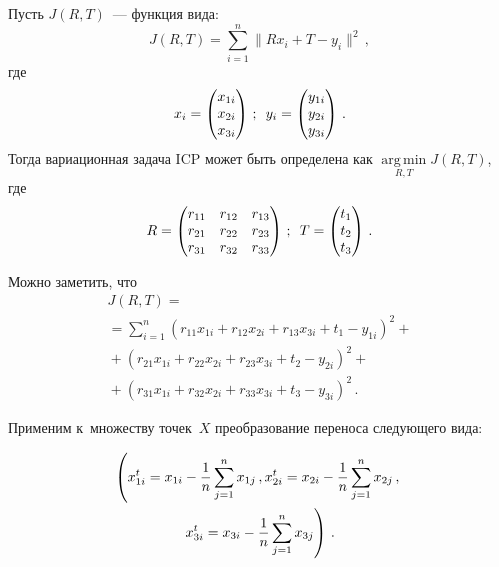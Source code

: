 \begin{multicols}{2}
Пусть $J(R,T)$~--- функция вида:
\begin{equation*}
J(R,T)=\sum\limits_{i=1}^n \| R x_i+T-y_i\|^2\,,
\end{equation*}
 где
 $$
x_i=\begin{pmatrix}
x_{1i}\\ x_{2i}\\ x_{3i}
\end{pmatrix}\,;\enskip
y_i=\begin{pmatrix}
y_{1i}\\ y_{2i}\\ y_{3i}
\end{pmatrix}\,.
$$
  Тогда вариационная задача ICP может быть определена как
 $\mathop{\mathrm{arg\,min}}\limits_{ R,T} J(R,T)$,
где 
$$
R=\begin{pmatrix}
r_{11} & r_{12} & r_{13}\\
r_{21} & r_{22} & r_{23}\\
r_{31} & r_{32} & r_{33}\end{pmatrix}\,;\enskip
T=\begin{pmatrix}
t_1\\ t_2\\ t_3
\end{pmatrix}\,.
\vspace*{6pt}
$$

  
  Можно заметить, что
  \begin{multline}
  J(R,T)={}\\
  {}=\sum\limits_{i=1}^n  \left( 
r_{11}x_{1i}+r_{12}x_{2i}+r_{13}x_{3i}+t_1-y_{1i}\right)^2+{}\\
  {}+ \left( r_{21}x_{1i}+r_{22}x_{2i}+r_{23}x_{3i}+t_2 -y_{2i}\right)^2+{}\\
  {}+ \left( r_{31}x_{1i}+r_{32}x_{2i}+r_{33}x_{3i}+t_3-y_{3i}\right)^2\,.
  \label{e9-voh}
  \end{multline}
  
  Применим к~множеству точек~$X$ преобразование переноса сле\-ду\-юще\-го 
вида:

\noindent
  \begin{multline*}
  \left( x^t_{1i}=x_{1i}-\displaystyle\frac{\displaystyle 1\mathstrut}{\displaystyle n\mathstrut}\sum\limits^n_{j=1}x_{1j}\,,
  x^t_{2i}=x_{2i}-\displaystyle\frac{\displaystyle 1\mathstrut}{\displaystyle n\mathstrut}\sum\limits^n_{j=1} x_{2j}\,,\right.\\
  \left. x^t_{3i}=x_{3i}-\displaystyle\frac{\displaystyle 1\mathstrut}{\displaystyle n\mathstrut}\sum\limits^n_{j=1}x_{3j}\right)\,.
  \end{multline*}
  

\end{multicols}

